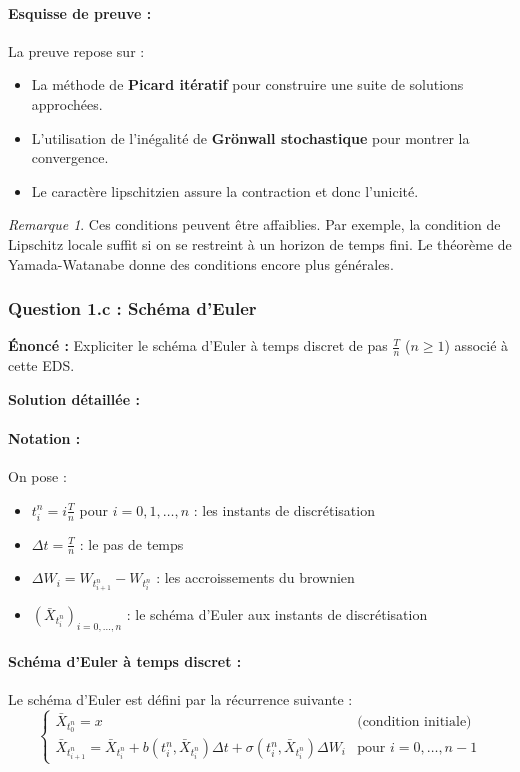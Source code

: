 \documentclass[12pt,a4paper]{article}
\theoremstyle{definition}
\theoremstyle{remark}
\newtheorem*{remark}{Remarque}
\begin{document}
\paragraph{Esquisse de preuve :}
La preuve repose sur :
\begin{itemize}
\item La méthode de \textbf{Picard itératif} pour construire une suite de solutions approchées.
\item L'utilisation de l'inégalité de \textbf{Grönwall stochastique} pour montrer la convergence.
\item Le caractère lipschitzien assure la contraction et donc l'unicité.
\end{itemize}

\begin{remark}
Ces conditions peuvent être affaiblies. Par exemple, la condition de Lipschitz locale suffit si on se restreint à un horizon de temps fini. Le théorème de Yamada-Watanabe donne des conditions encore plus générales.
\end{remark}

\subsubsection{Question 1.c : Schéma d'Euler}

\textbf{Énoncé :} Expliciter le schéma d'Euler à temps discret de pas $\frac{T}{n}$ ($n \geq 1$) associé à cette EDS.

\textbf{Solution détaillée :}

\paragraph{Notation :}
On pose :
\begin{itemize}
\item $t_i^n = i\frac{T}{n}$ pour $i = 0, 1, \ldots, n$ : les instants de discrétisation
\item $\Delta t = \frac{T}{n}$ : le pas de temps
\item $\Delta W_i = W_{t_{i+1}^n} - W_{t_i^n}$ : les accroissements du brownien
\item $(\bar{X}_{t_i^n})_{i=0,\ldots,n}$ : le schéma d'Euler aux instants de discrétisation
\end{itemize}

\paragraph{Schéma d'Euler à temps discret :}
Le schéma d'Euler est défini par la récurrence suivante :
\begin{equation}
\begin{cases}
\bar{X}_{t_0^n} = x & \text{(condition initiale)} \\
\bar{X}_{t_{i+1}^n} = \bar{X}_{t_i^n} + b(t_i^n, \bar{X}_{t_i^n})\Delta t + \sigma(t_i^n, \bar{X}_{t_i^n})\Delta W_i & \text{pour } i = 0, \ldots, n-1
\end{cases}
\end{equation}
\end{document}
